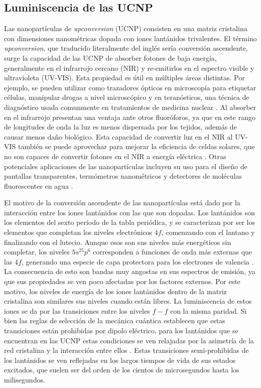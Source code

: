 \subsection{Luminiscencia de las UCNP}

Las nanopartículas de \textit{upconversion} (UCNP) consisten en una matriz cristalina con dimensiones nanométricas dopada con iones lantánidos trivalentes.
El término \textit{upconversion}, que traducido literalmente del inglés sería conversión ascendente, surge la capacidad de las UCNP de absorber fotones de baja energía, generalmente en el infrarrojo cercano (NIR) y re-emitirlos en el espectro visible y ultravioleta (UV-VIS).
Esta propiedad es útil en múltiples áreas distintas.
Por ejemplo, se pueden utilizar como trazadores ópticos en microscopía para etiquetar células, manipular drogas a nivel microscópico y en teranósticos, una técnica de diagnóstico usada comunmente en tratamientos de medicina nuclear \cite{shen_lanthanidedoped_2013,guryev_ucnpbased_2020,haase_upconverting_2011}.
Al absorber en el infrarrojo presentan una ventaja ante otros fluoróforos, ya que en este rango de longitudes de onda la luz es menos dispersada por los tejidos, además de causar menos daño biológico.
Esta capacidad de convertir luz en el NIR al UV-VIS también se puede aprovechar para mejorar la eficiencia de celdas solares, que no son capaces de convertir fotones en el NIR a energía eléctrica \cite{hao_enhancing_2017}.
Otras potenciales aplicaciones de las nanopartículas incluyen su uso para el diseño de pantallas transparentes, termómetros nanométricos y detectores de moléculas fluorescentes en agua \cite{hong_orthogonal_2021,savchuk_thermochromic_2016, bujjamer_first_2021}.

El motivo de la conversión ascendente de las nanopartículas está dado por la interacción entre los iones lantánidos con las que son dopadas.
Los lantánidos son los elementos del sexto período de la tabla periódica, y se caracterizan por ser los elementos que completan los niveles electrónicos $4f$, comenzando con el lantano y finalizando con el lutecio.
Aunque esos son sus niveles más energéticos sin completar, los niveles $5s^25p^6$ corresponden a funciones de onda más externas que las $4f$, generando una especie de capa protectora para los electrones de valencia \cite{lanthanides}.
La consecuencia de esto son bandas muy angostas en sus espectros de emisión, ya que sus propiedades se ven poco afectadas por los factores externos. 
Por este motivo, los niveles de energía de los iones lantánidos dentro de la matriz cristalina son similares sus niveles cuando están libres\cite{nadort_lanthanide_2016}.
La luminiscencia de estos iones se da por las transiciones entre los niveles $f-f$ con la misma paridad.
Si bien las reglas de selección de la mecánica cuántica establecen que estas transiciones están prohibidas por dipolo eléctrico, para los lantánidos que se encuentran en las UCNP estas condiciones se ven relajadas por la asimetría de la red cristalina y la interacción entre ellos \cite{basics_of_lanthanide}.
Estas transiciones semi-prohibidas de los lantánidos se ven reflejadas en los largos tiempos de vida de sus estados excitados, que suelen ser del orden de los cientos de microsegundos hasta los milisegundos.

